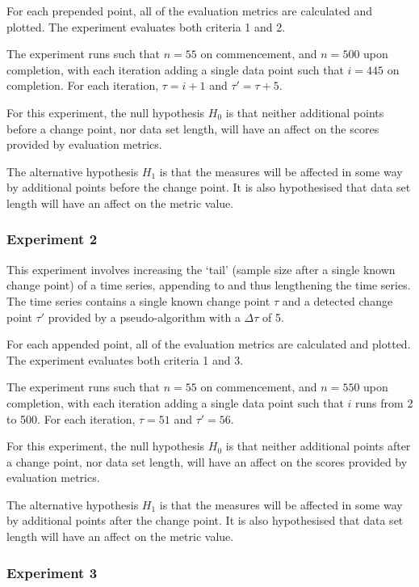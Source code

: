 \documentclass[../main.tex]{subfiles}
\begin{document}
For each prepended point, all of the evaluation metrics are calculated and plotted. The experiment evaluates both criteria 1 and 2.

The experiment runs such that $n = 55$ on commencement, and $n = 500$ upon completion, with each iteration adding a single data point such that $i = 445$ on completion. For each iteration, $\tau = i + 1$ and $\tau' = \tau + 5$.

For this experiment, the null hypothesis $H_0$ is that neither additional points before a change point, nor data set length, will have an affect on the scores provided by evaluation metrics.

The alternative hypothesis $H_1$ is that the measures will be affected in some way by additional points before the change point. It is also hypothesised that data set length will have an affect on the metric value.


\subsubsection{Experiment 2}

This experiment involves increasing the `tail' (sample size after a single known change point) of a time series, appending to and thus lengthening the time series. The time series contains a single known change point $\tau$ and a detected change point $\tau'$ provided by a pseudo-algorithm with a $\Delta \tau$ of 5.

For each appended point, all of the evaluation metrics are calculated and plotted. The experiment evaluates both criteria 1 and 3.

The experiment runs such that $n=55$ on commencement, and $n=550$ upon completion, with each iteration adding a single data point such that $i$ runs from 2 to 500. For each iteration, $\tau = 51$ and $\tau' = 56$.

For this experiment, the null hypothesis $H_0$ is that neither additional points after a change point, nor data set length, will have an affect on the scores provided by evaluation metrics.

The alternative hypothesis $H_1$ is that the measures will be affected in some way by additional points after the change point. It is also hypothesised that data set length will have an affect on the metric value.

\subsubsection{Experiment 3}
\end{document}
